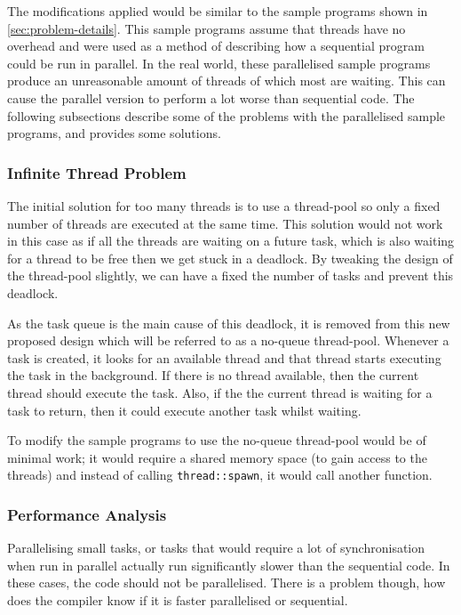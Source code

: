 \documentclass[conference]{IEEEtran}
\begin{document}
The modifications applied would be similar to the sample programs shown in \autoref{sec:problem-details}. This sample programs assume that threads have no overhead and were used as a method of describing how a sequential program could be run in parallel. In the real world, these parallelised sample programs produce an unreasonable amount of threads of which most are waiting. This can cause the parallel version to perform a lot worse than sequential code. The following subsections describe some of the problems with the parallelised sample programs, and provides some solutions.

\subsubsection{Infinite Thread Problem}
The initial solution for too many threads is to use a thread-pool so only a fixed number of threads are executed at the same time. This solution would not work in this case as if all the threads are waiting on a future task, which is also waiting for a thread to be free then we get stuck in a deadlock. By tweaking the design of the thread-pool slightly, we can have a fixed the number of tasks and prevent this deadlock.

As the task queue is the main cause of this deadlock, it is removed from this new proposed design which will be referred to as a no-queue thread-pool. Whenever a task is created, it looks for an available thread and that thread starts executing the task in the background. If there is no thread available, then the current thread should execute the task. Also, if the the current thread is waiting for a task to return, then it could execute another task whilst waiting.  

To modify the sample programs to use the no-queue thread-pool would be of minimal work; it would require a shared memory space (to gain access to the threads) and instead of calling \texttt{thread::spawn}, it would call another function.

\subsubsection{Performance Analysis}
Parallelising small tasks, or tasks that would require a lot of synchronisation when run in parallel actually run significantly slower than the sequential code. In these cases, the code should not be parallelised. There is a problem though, how does the compiler know if it is faster parallelised or sequential.
\end{document}
